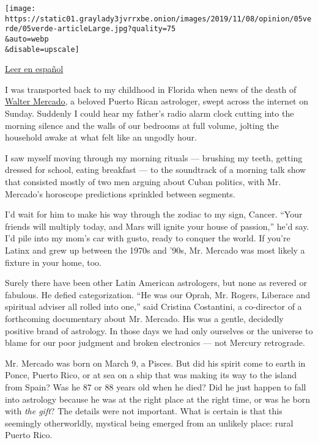 \texttt{[image: https://static01.graylady3jvrrxbe.onion/images/2019/11/08/opinion/05verde/05verde-articleLarge.jpg?quality=75\\\&auto=webp\\\&disable=upscale]}

\href{https://www.nytimes3xbfgragh.onion/es/2019/11/06/espanol/opinion/walter-mercado.html}{Leer
en español}

I was transported back to my childhood in Florida when news of the death
of
\href{https://www.nytimes3xbfgragh.onion/2019/11/03/world/americas/walter-mercado-dead.html}{Walter
Mercado}, a beloved Puerto Rican astrologer, swept across the internet
on Sunday. Suddenly I could hear my father's radio alarm clock cutting
into the morning silence and the walls of our bedrooms at full volume,
jolting the household awake at what felt like an ungodly hour.

I saw myself moving through my morning rituals --- brushing my teeth,
getting dressed for school, eating breakfast --- to the soundtrack of a
morning talk show that consisted mostly of two men arguing about Cuban
politics, with Mr. Mercado's horoscope predictions sprinkled between
segments.

I'd wait for him to make his way through the zodiac to my sign, Cancer.
``Your friends will multiply today, and Mars will ignite your house of
passion,'' he'd say. I'd pile into my mom's car with gusto, ready to
conquer the world. If you're Latinx and grew up between the 1970s and
'90s, Mr. Mercado was most likely a fixture in your home, too.

Surely there have been other Latin American astrologers, but none as
revered or fabulous. He defied categorization. ``He was our Oprah, Mr.
Rogers, Liberace and spiritual adviser all rolled into one,'' said
Cristina Costantini, a co-director of a forthcoming documentary about
Mr. Mercado. His was a gentle, decidedly positive brand of astrology. In
those days we had only ourselves or the universe to blame for our poor
judgment and broken electronics --- not Mercury retrograde.

Mr. Mercado was born on March 9, a Pisces. But did his spirit come to
earth in Ponce, Puerto Rico, or at sea on a ship that was making its way
to the island from Spain? Was he 87 or 88 years old when he died? Did he
just happen to fall into astrology because he was at the right place at
the right time, or was he born with \emph{the gift}? The details were
not important. What is certain is that this seemingly otherworldly,
mystical being emerged from an unlikely place: rural Puerto Rico.

